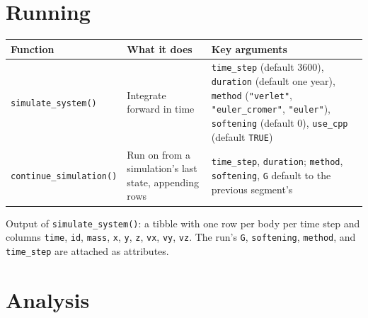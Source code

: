 \documentclass[
  10.5pt,
  letterpaper,
]{scrbook}
\newcounter{none} %
\theoremstyle{definition}
\theoremstyle{plain}
\theoremstyle{remark}
\begin{document}
\section{Running}\label{running}

{\def\LTcaptype{none} %
\begin{longtable}[]{@{}
  >{\raggedright\arraybackslash}p{}
  >{\raggedright\arraybackslash}p{}
  >{\raggedright\arraybackslash}p{}@{}}
\toprule\noalign{}
\begin{minipage}[b]{\linewidth}\raggedright
Function
\end{minipage} & \begin{minipage}[b]{\linewidth}\raggedright
What it does
\end{minipage} & \begin{minipage}[b]{\linewidth}\raggedright
Key arguments
\end{minipage} \\
\midrule\noalign{}
\endhead
\bottomrule\noalign{}
\endlastfoot
\texttt{simulate\_system()} & Integrate forward in time &
\texttt{time\_step} (default 3600), \texttt{duration} (default one
year), \texttt{method} (\texttt{"verlet"}, \texttt{"euler\_cromer"},
\texttt{"euler"}), \texttt{softening} (default 0), \texttt{use\_cpp}
(default \texttt{TRUE}) \\
\texttt{continue\_simulation()} & Run on from a simulation's last state,
appending rows & \texttt{time\_step}, \texttt{duration};
\texttt{method}, \texttt{softening}, \texttt{G} default to the previous
segment's \\
\end{longtable}
}

Output of \texttt{simulate\_system()}: a tibble with one row per body
per time step and columns \texttt{time}, \texttt{id}, \texttt{mass},
\texttt{x}, \texttt{y}, \texttt{z}, \texttt{vx}, \texttt{vy},
\texttt{vz}. The run's \texttt{G}, \texttt{softening}, \texttt{method},
and \texttt{time\_step} are attached as attributes.

\section{Analysis}\label{analysis}
\end{document}
